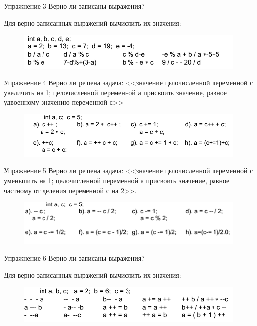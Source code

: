 \documentclass{beamer}
\begin{document}
\begin{frame}{Упражнение 3}
Верно ли записаны выражения? 

Для верно записанных выражений вычислить их значения:
\begin{figure}[h]
\centering
\includegraphics[scale=0.5]{images/lec02-pic06-03.png}
\end{figure}
\end{frame}

\begin{frame}{Упражнение 4}
Верно ли решена задача: <<значение целочисленной переменной с увеличить на 1; целочисленной переменной а присвоить значение, равное удвоенному значению переменной с>>
\begin{figure}[h]
\centering
\includegraphics[scale=0.5]{images/lec02-pic06-04.png}
\end{figure}
\end{frame}

\begin{frame}{Упражнение 5}
Верно ли решена задача: <<значение целочисленной переменной с
уменьшить на 1; целочисленной переменной а присвоить значение, равное частному от деления переменной с на 2>>.
\begin{figure}[h]
\centering
\includegraphics[scale=0.5]{images/lec02-pic06-05.png}
\end{figure}
\end{frame}

\begin{frame}{Упражнение 6}
Верно ли записаны выражения? 

Для верно записанных выражений вычислить их значения:
\begin{figure}[h]
\centering
\includegraphics[scale=0.5]{images/lec02-pic06-06.png}
\end{figure}
\end{frame}
\end{document}
